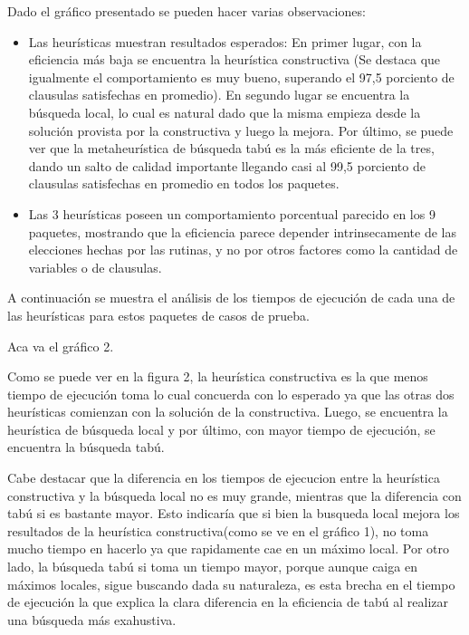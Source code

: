 \documentclass[a4paper,10pt]{article}
\begin{document}
Dado el gr\'afico presentado se pueden hacer varias observaciones:
\begin{itemize}
\item Las heur\'isticas muestran resultados esperados: En primer lugar, con la eficiencia m\'as baja se encuentra la heur\'istica constructiva (Se destaca que igualmente el comportamiento es muy bueno, superando el 97,5 porciento de clausulas satisfechas en promedio). En segundo lugar se encuentra la b\'usqueda local, lo cual es natural dado que la misma empieza desde la soluci\'on provista por la constructiva y luego la mejora. Por \'ultimo, se puede ver que la metaheur\'istica de b\'usqueda tab\'u es la m\'as eficiente de la tres, dando un salto de calidad importante llegando casi al 99,5 porciento de clausulas satisfechas en promedio en todos los paquetes.
\item Las 3 heur\'isticas poseen un comportamiento porcentual parecido en los 9 paquetes, mostrando que la eficiencia parece depender intrinsecamente de las elecciones hechas por las rutinas, y no por otros factores como la cantidad de variables o de clausulas.
\end{itemize}


A continuaci\'on se muestra el an\'alisis de los tiempos de ejecuci\'on de cada una de las heur\'isticas para estos paquetes de casos de prueba.


Aca va el gr\'afico 2.



Como se puede ver en la figura 2, la heur\'istica constructiva es la que menos tiempo de ejecuci\'on toma lo cual concuerda con lo esperado ya que las otras dos heur\'isticas comienzan con la soluci\'on de la constructiva. Luego, se encuentra la heur\'istica de b\'usqueda local y por \'ultimo, con mayor tiempo de ejecuci\'on, se encuentra la b\'usqueda tab\'u.

Cabe destacar que la diferencia en los tiempos de ejecucion entre la heur\'istica constructiva y la b\'usqueda local no es muy grande, mientras que la diferencia con tab\'u si es bastante mayor. Esto indicar\'ia que si bien la busqueda local mejora los resultados de la heur\'istica constructiva(como se ve en el gr\'afico 1), no toma mucho tiempo en hacerlo ya que rapidamente cae en un m\'aximo local. Por otro lado, la b\'usqueda tab\'u si toma un tiempo mayor, porque aunque caiga en m\'aximos locales, sigue buscando dada su naturaleza, es esta brecha en el tiempo de ejecuci\'on la que explica la clara diferencia en la eficiencia de tab\'u al realizar una b\'usqueda m\'as exahustiva.
\end{document}
